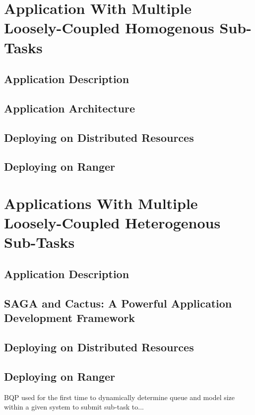 \documentclass[conference,final]{IEEEtran}
\begin{document}
\section{Application With Multiple Loosely-Coupled Homogenous
  Sub-Tasks}

\subsection{Application Description}

\subsection{Application Architecture}

\subsection{Deploying on Distributed Resources}

\subsection{Deploying on Ranger}


\section{Applications With Multiple Loosely-Coupled Heterogenous
  Sub-Tasks}

\subsection{Application Description}

\subsection{SAGA and Cactus: A Powerful Application Development
  Framework}

\subsection{Deploying on Distributed Resources}

\subsection{Deploying on Ranger}

BQP used for the first time to dynamically determine queue and model
size within a given system to submit sub-task to...
\end{document}
